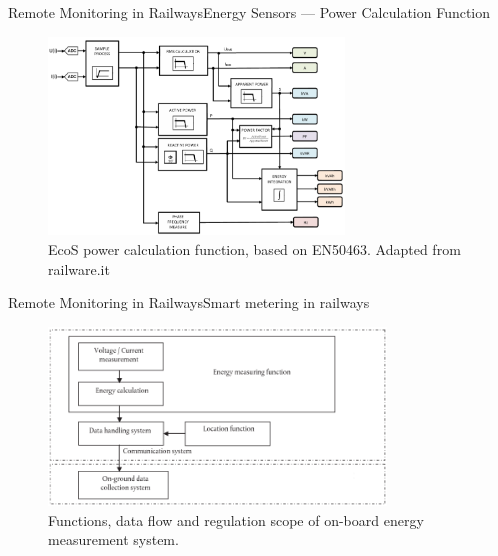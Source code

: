
\begin{frame}{Remote Monitoring in Railways}{Energy Sensors --- Power Calculation Function}


\begin{figure}[h!]
	\centering
	\includegraphics[width=0.7\textwidth,keepaspectratio]{figures/32.EnergyS/energy_calculation}
	\caption{EcoS power calculation function, based on EN50463. Adapted from railware.it}
\end{figure}
	
	
\end{frame}

\begin{frame}{Remote Monitoring in Railways}{Smart metering in railways}

\begin{figure}[h!]
	\centering
	\includegraphics[width=0.8\textwidth,keepaspectratio]{figures/34.SmartM/EMS}
	\caption{Functions, data flow and regulation scope of on-board energy measurement system.}
\end{figure}

\end{frame}

